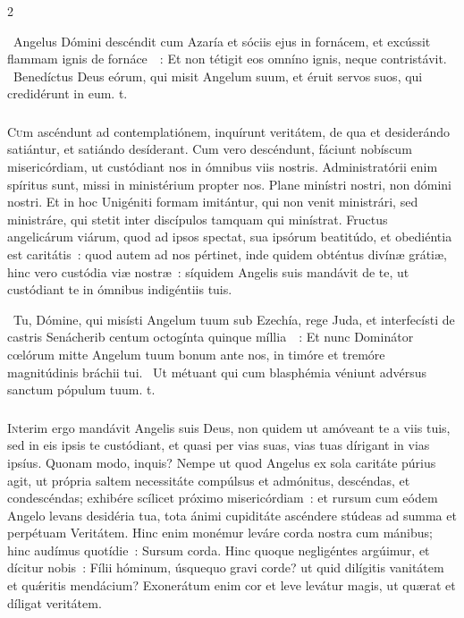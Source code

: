 \documentclass[9pt,twoside]{extarticle}
\begin{document}
\begin{multicols}{2}
{{\begin{tightlist}{}
\item {}~Angelus Dómini descéndit cum Azaría et sóciis ejus in fornácem, et excússit flammam ignis de fornáce~~: \textred{*} Et non tétigit eos omníno ignis, neque contristávit. ~Benedíctus Deus eórum, qui misit Angelum suum, et éruit servos suos, qui credidérunt in eum. t.
\end{tightlist}

\subsubsection*{\center {}}
\lettrine{C}um ascéndunt ad contemplatiónem, inquírunt veritátem, de qua et desiderándo satiántur, et satiándo desíderant. Cum vero descéndunt, fáciunt nobíscum misericórdiam, ut custódiant nos in ómnibus viis nostris. Administratórii enim spíritus sunt, missi in ministérium propter nos. Plane minístri nostri, non dómini nostri. Et in hoc Unigéniti formam imitántur, qui non venit ministrári, sed ministráre, qui stetit inter discípulos tamquam qui minístrat. Fructus angelicárum viárum, quod ad ipsos spectat, sua ipsórum beatitúdo, et obediéntia est caritátis~: quod autem ad nos pértinet, inde quidem obténtus divínæ grátiæ, hinc vero custódia viæ nostræ~: síquidem Angelis suis mandávit de te, ut custódiant te in ómnibus indigéntiis tuis.

\begin{tightlist}{}
\item {}~Tu, Dómine, qui misísti Angelum tuum sub Ezechía, rege Juda, et interfecísti de castris Senácherib centum octogínta quinque míllia~~: \textred{*} Et nunc Dominátor cœlórum mitte Angelum tuum bonum ante nos, in timóre et tremóre magnitúdinis bráchii tui. ~Ut métuant qui cum blasphémia véniunt advérsus sanctum pópulum tuum. t.
\end{tightlist}

\subsubsection*{\center {}}
\lettrine{I}nterim ergo mandávit Angelis suis Deus, non quidem ut amóveant te a viis tuis, sed in eis ipsis te custódiant, et quasi per vias suas, vias tuas dírigant in vias ipsíus. Quonam modo, inquis? Nempe ut quod Angelus ex sola caritáte púrius agit, ut própria saltem necessitáte compúlsus et admónitus, descéndas, et condescéndas; exhibére scílicet próximo misericórdiam~: et rursum cum eódem Angelo levans desidéria tua, tota ánimi cupiditáte ascéndere stúdeas ad summa et perpétuam Veritátem. Hinc enim monémur leváre corda nostra cum mánibus; hinc audímus quotídie~: Sursum corda. Hinc quoque negligéntes argúimur, et dícitur nobis~: Fílii hóminum, úsquequo gravi corde? ut quid dilígitis vanitátem et quǽritis mendácium? Exonerátum enim cor et leve levátur magis, ut quærat et díligat veritátem.

}}
\end{multicols}
\end{document}
